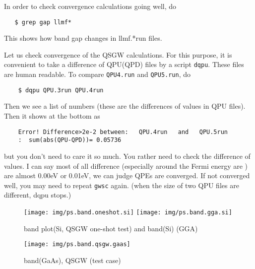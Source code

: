 \documentclass[a4paper,10pt,epsf,fleqn]{article}
\begin{document}
In order to check convergence calculations going well, do
\begin{verbatim}
   $ grep gap llmf*
\end{verbatim}
This shows how band gap changes in llmf.*run files.

Let us check convergence of the QSGW calculations.
For this purpose, it is convenient to take a difference of QPU(QPD) files
by a script \verb+dqpu+. These files are human readable.
To compare \verb+QPU4.run+ and \verb+QPU5.run+, do
\begin{verbatim}
    $ dqpu QPU.3run QPU.4run
\end{verbatim}
Then we see a list of numbers (these are the differences of values in
QPU files).  Then it shows at the bottom as
\begin{verbatim}
    Error! Difference>2e-2 between:   QPU.4run   and   QPU.5run  
    :  sum(abs(QPU-QPD))= 0.05736
\end{verbatim}
but you don't need to care it so much.
You rather need to check the difference of values.
I can say most of all difference (especially around the Fermi energy are
) are almost 0.00eV or 0.01eV, we can judge QPEs are converged.
If not converged well, you may need to repeat 
\verb+gwsc+ again.
(when the size of two QPU files are different, dqpu stops.)

\begin{figure}[h]
 \begin{center}
  \texttt{[image: img/ps.band.oneshot.si]}
  \texttt{[image: img/ps.band.gga.si]}
  \caption{band plot(Si, QSGW one-shot test)    and    band(Si) (GGA)}
 \end{center}
\end{figure}



\begin{figure}[hbtp]
  \texttt{[image: img/ps.band.qsgw.gaas]}
  \caption{band(GaAs), QSGW (test case)}
\end{figure}
\end{document}
